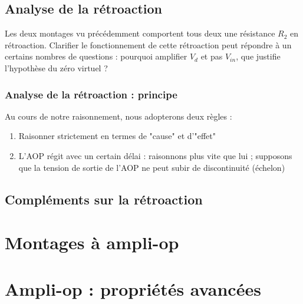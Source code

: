\subsection{Analyse de la rétroaction}
Les deux montages vu précédemment comportent tous deux une résistance $R_2$ en rétroaction. Clarifier le fonctionnement de cette rétroaction peut répondre à un certains nombres de questions : pourquoi amplifier $V_d$ et pas $V_{in}$, que justifie l'hypothèse du zéro virtuel ?

\subsubsection{Analyse de la rétroaction : principe}
Au cours de notre raisonnement, nous adopterons deux règles :
\begin{enumerate}
\item Raisonner strictement en termes de "cause" et d'"effet"
\item L'AOP régit avec un certain délai : raisonnons plus vite que lui ; supposons que la tension de sortie de l'AOP ne peut subir de discontinuité (échelon)
\end{enumerate}


\subsection{Compléments sur la rétroaction}




\section{Montages à ampli-op}
\section{Ampli-op : propriétés avancées}